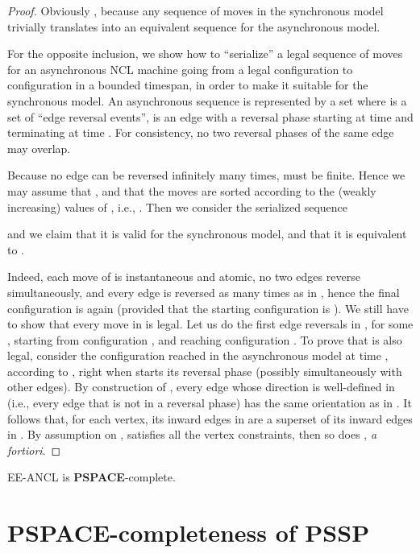 \documentclass{style}
\newcommand{\complexityclass}[1]{\textbf{#1}}
\newcommand{\computproblem}[1]{\textsc{#1}}
\newcommand{\PSPACE}{\complexityclass{PSPACE}\xspace}
\newcommand{\EEANCL}{\computproblem{EE-ANCL}\xspace}
\newcommand{\PSSP}{\computproblem{PSSP}\xspace}
\begin{document}
\begin{proof}
Obviously , because any sequence of moves in the synchronous model trivially translates into an equivalent sequence for the asynchronous model.

For the opposite inclusion, we show how to ``serialize'' a legal sequence of moves for an asynchronous NCL machine going from a legal configuration  to configuration  in a bounded timespan, in order to make it suitable for the synchronous model. An asynchronous sequence is represented by a set
 where  is a set of ``edge reversal events'',  is an edge with a reversal phase starting at time  and terminating at time . For consistency, no two reversal phases of the same edge may overlap.

Because no edge can be reversed infinitely many times,  must be finite. Hence we may assume that , and that the moves are sorted according to the (weakly increasing) values of , i.e., . Then we consider the serialized sequence

and we claim that it is valid for the synchronous model, and that it is equivalent to .

Indeed, each move of  is instantaneous and atomic, no two edges reverse simultaneously, and every edge is reversed as many times as in , hence the final configuration is again  (provided that the starting configuration is ). We still have to show that every move in  is legal. Let us do the first  edge reversals in , for some , starting from configuration , and reaching configuration . To prove that  is also legal, consider the configuration  reached in the asynchronous model at time , according to , right when  starts its reversal phase (possibly simultaneously with other edges). By construction of , every edge whose direction is well-defined in  (i.e., every edge that is not in a reversal phase) has the same orientation as in . It follows that, for each vertex, its inward edges in  are a superset of its inward edges in . By assumption on ,  satisfies all the vertex constraints, then so does , {\it a fortiori}.
\end{proof}

\begin{cor}\label{eeancl}\EEANCL is \PSPACE-complete. \hfill \end{cor}




\section{\PSPACE-completeness of \PSSP}
\end{document}
